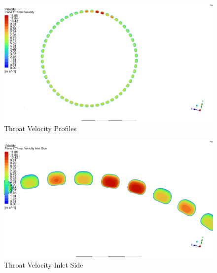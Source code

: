 \begin{figure}
    \centering
    \includegraphics[width=1\linewidth]{Throat Velocity Profiles.png}
    \caption{Throat Velocity Profiles}
    \label{fig:Throat Velocity Profiles}
\end{figure}
\begin{figure}
    \centering
    \includegraphics[width=1\linewidth]{Images/Throat Velocity Inlet Side.png}
    \caption{Throat Velocity Inlet Side}
    \label{fig:Throat Velocity Inlet Side}
\end{figure}

